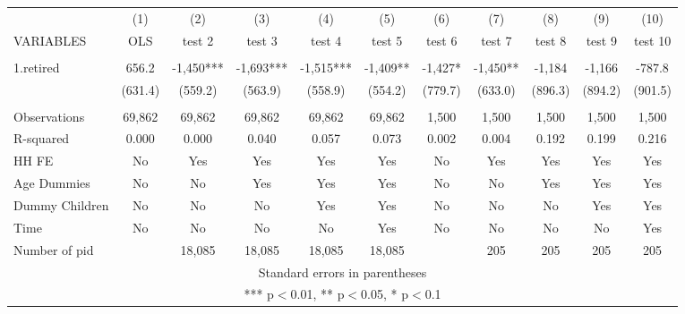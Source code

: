 \begin{tabular}{lcccccccccc} \hline
 & (1) & (2) & (3) & (4) & (5) & (6) & (7) & (8) & (9) & (10) \\
VARIABLES & OLS & test 2 & test 3 & test 4 & test 5 & test 6 & test 7 & test 8 & test 9 & test 10 \\ \hline
 &  &  &  &  &  &  &  &  &  &  \\
1.retired & 656.2 & -1,450*** & -1,693*** & -1,515*** & -1,409** & -1,427* & -1,450** & -1,184 & -1,166 & -787.8 \\
 & (631.4) & (559.2) & (563.9) & (558.9) & (554.2) & (779.7) & (633.0) & (896.3) & (894.2) & (901.5) \\
 &  &  &  &  &  &  &  &  &  &  \\
Observations & 69,862 & 69,862 & 69,862 & 69,862 & 69,862 & 1,500 & 1,500 & 1,500 & 1,500 & 1,500 \\
R-squared & 0.000 & 0.000 & 0.040 & 0.057 & 0.073 & 0.002 & 0.004 & 0.192 & 0.199 & 0.216 \\
HH FE & No & Yes & Yes & Yes & Yes & No & Yes & Yes & Yes & Yes \\
Age Dummies & No & No & Yes & Yes & Yes & No & No & Yes & Yes & Yes \\
Dummy Children & No & No & No & Yes & Yes & No & No & No & Yes & Yes \\
Time & No & No & No & No & Yes & No & No & No & No & Yes \\
 Number of pid &  & 18,085 & 18,085 & 18,085 & 18,085 &  & 205 & 205 & 205 & 205 \\ \hline
\multicolumn{11}{c}{ Standard errors in parentheses} \\
\multicolumn{11}{c}{ *** p$<$0.01, ** p$<$0.05, * p$<$0.1} \\
\end{tabular}
